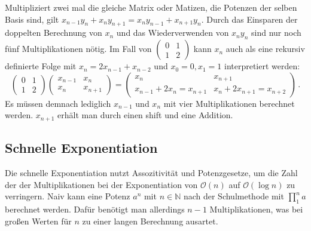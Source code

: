 \documentclass[course=erap]{aspdoc}
\begin{document}
Multipliziert zwei mal die gleiche Matrix oder Matizen, die Potenzen der selben Basis sind, gilt $x_{n-1}y_n+x_ny_{n+1} = x_ny_{n-1}+x_{n+1}y_n$.
Durch das Einsparen der doppelten Berechnung von $x_n$ und das Wiederverwenden von $x_ny_n$ sind nur noch fünf Multiplikationen nötig. 
Im Fall von $\left(\begin{matrix}
      0 & 1 \\
      1 & 2
\end{matrix}\right)$ kann $x_n$ auch als eine rekursiv definierte Folge mit $x_n=2x_{n-1}+x_{n-2}$ und $x_0=0, x_1=1$ interpretiert werden:
\[
\left(\begin{matrix}
      0 & 1 \\
      1 & 2
\end{matrix}\right)
\left(\begin{matrix}
      x_{n-1} & x_n \\
      x_n     & x_{n+1}
\end{matrix}\right)
=
\left(\begin{matrix}
      x_n &  x_{n+1}\\
      x_{n-1}+2x_n = x_{n+1} & x_n + 2x_{n+1}=x_{n+2}
\end{matrix}\right) \, .
\]
Es müssen demnach lediglich $x_{n-1}$ und $x_n$ mit vier Multiplikationen berechnet werden. $x_{n+1}$ erhält man durch einen shift und eine Addition.

\subsection{Schnelle Exponentiation}
Die schnelle Exponentiation nutzt Assozitivität und Potenzgesetze, um die Zahl der der Multiplikationen bei der Exponentiation von $\mathcal{O}(n)$ auf $\mathcal{O}(\log{}n)$ zu verringern. 
Naiv kann eine Potenz $a^n$ mit $n\in\mathbb{N}$ nach der Schulmethode mit \(\prod_{1}^{n} a \) berechnet werden. 
Dafür benötigt man allerdings $n-1$ Multiplikationen, was bei großen Werten für $n$ zu einer langen Berechnung ausartet.\\
\end{document}

